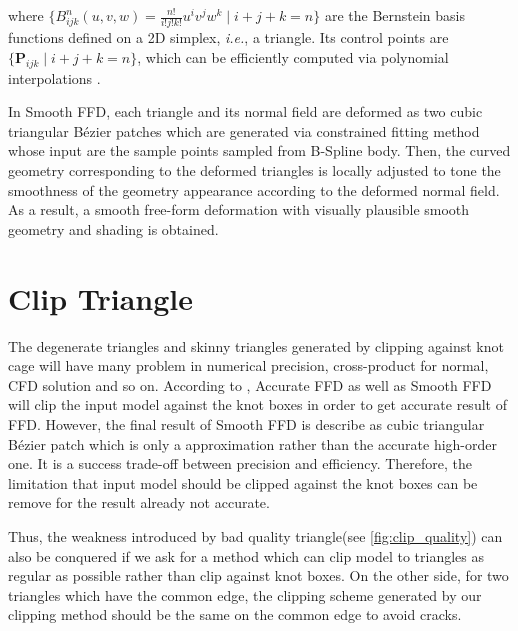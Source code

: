 \documentclass[3p]{elsarticle}
\begin{document}
\noindent where $\{B_{ijk}^n(u,v,w)=\frac{n!}{i!j!k!}u^iv^jw^k \mid i+j+k=n\}$ are the Bernstein basis functions
defined on a 2D simplex, \textit{i.e.}, a triangle. Its control points are $\{\mathbf P_{ijk} \mid i+j+k=n\}$, which
can be efficiently computed via polynomial interpolations \cite{Feng00}.

In Smooth FFD, each triangle and its normal field are deformed as two cubic triangular Bézier patches which are generated via constrained fitting method whose input are the sample points  sampled from B-Spline body. Then, the curved geometry corresponding to the deformed triangles is locally adjusted to tone the smoothness of the geometry appearance according to the deformed normal field. As a result, a smooth free-form deformation with visually plausible smooth geometry and shading is obtained.

\section{Clip Triangle}
The degenerate triangles and skinny triangles generated by clipping against knot cage will have many problem in numerical precision, cross-product for normal, CFD solution and so on.
According to \cite{Feng98, Feng00}, Accurate FFD as well as Smooth FFD will clip the input model against the knot boxes in order to get accurate result of FFD. However, the final result of Smooth FFD is describe as cubic triangular Bézier patch which is only a approximation rather than the accurate high-order one. It is a success trade-off between precision and efficiency. Therefore, the limitation that input model should be clipped against the knot boxes can be remove for the result already not accurate.

Thus, the weakness introduced by bad quality triangle(see \ref{fig:clip_quality}) can also be conquered if we ask for a method which can clip model to triangles as regular as possible rather than clip against knot boxes. On the other side, for two triangles which have the common edge, the clipping scheme generated by our clipping method should be the same on the common edge to avoid cracks.
\end{document}
